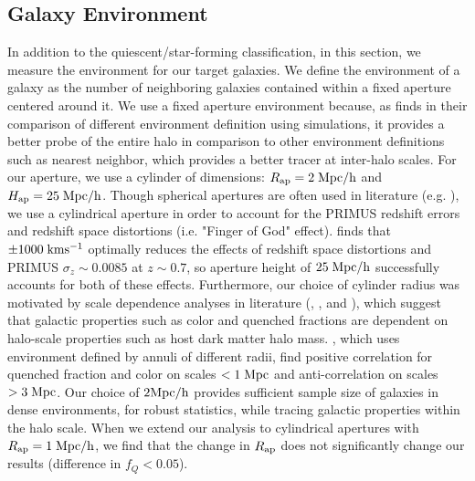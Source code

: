 \documentclass{emulateapj}
\begin{document}
\subsection{Galaxy Environment} \label{sec:environment}
In addition to the quiescent/star-forming classification, in this section, 
we measure the environment for our target galaxies. We define the 
environment of a galaxy as the number of neighboring galaxies 
contained within a fixed aperture centered around it. We use a fixed 
aperture environment because, as \cite{Muldrew:2012aa} finds in 
their comparison of different environment definition using simulations, 
it provides a better probe of the entire halo in comparison to other 
environment definitions such as nearest neighbor, which provides 
a better tracer at inter-halo scales. For our aperture, 
we use a cylinder of dimensions: $R_{\rm{ap}} = 2 \; \rm{Mpc}/h$ and 
$H_{\rm{ap}} = 25 \; \rm{Mpc}/h$. Though spherical apertures are 
often used in literature (e.g. \cite{Croton:2005aa}), we use a 
cylindrical aperture in order to account for the PRIMUS redshift errors 
and redshift space distortions (i.e. "Finger of God" effect). \cite{Cooper:2005aa} 
finds that $\pm 1000 \; \rm{km} \rm{s^{-1}}$ optimally reduces the 
effects of redshift space distortions and PRIMUS $\sigma_z \sim 
0.0085$ at $z \sim 0.7$, so aperture height of $25 \; \rm{Mpc}/h$ 
successfully accounts for both of these effects. Furthermore, our 
choice of cylinder radius was motivated by scale dependence 
analyses in literature (\cite{Blanton:2006aa}, \cite{Wilman:2010aa}, 
and \cite{Muldrew:2012aa}), which suggest that galactic properties 
such as color and quenched fractions are dependent on halo-scale 
properties such as host dark matter halo mass. \cite{Wilman:2010aa}, 
which uses environment defined by annuli of different radii, find 
positive correlation for quenched fraction and color on scales 
$< 1 \; \rm{Mpc}$ and anti-correlation on scales $> 3 \; \rm{Mpc}$. 
Our choice of $2 \rm{Mpc}/h$ provides sufficient sample size of 
galaxies in dense environments, for robust statistics, while 
tracing galactic properties within the halo scale. When we extend our 
analysis to cylindrical apertures with $R_{\rm{ap}} = 1 \; \rm{Mpc}/h$, 
we find that the change in $R_{\rm{ap}}$ does not significantly change 
our results (difference in $f_{Q} < 0.05$). 
\end{document}
